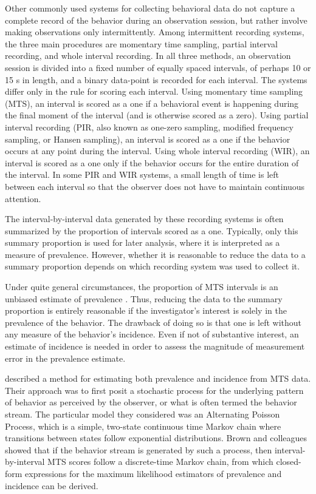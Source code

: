 \documentclass[man, noextraspace, floatsintext]{apa6}\usepackage[]{graphicx}\usepackage[]{color}
\begin{document}
Other commonly used systems for collecting behavioral data do not capture a complete record of the behavior during an observation session, but rather involve making observations only intermittently. 
Among intermittent recording systems, the three main procedures are momentary time sampling, partial interval recording, and whole interval recording. 
In all three methods, an observation session is divided into a fixed number of equally spaced intervals, of perhaps 10 or 15 s in length, and a binary data-point is recorded for each interval. 
The systems differ only in the rule for scoring each interval. 
Using momentary time sampling (MTS), an interval is scored as a one if a behavioral event is happening during the final moment of the interval (and is otherwise scored as a zero). 
Using partial interval recording (PIR, also known as one-zero sampling, modified frequency sampling, or Hansen sampling), an interval is scored as a one if the behavior occurs at any point during the interval. 
Using whole interval recording (WIR), an interval is scored as a one only if the behavior occurs for the entire duration of the interval. 
In some PIR and WIR systems, a small length of time is left between each interval so that the observer does not have to maintain continuous attention. 

The interval-by-interval data generated by these recording systems is often summarized by the proportion of intervals scored as a one. 
Typically, only this summary proportion is used for later analysis, where it is interpreted as a measure of prevalence. 
However, whether it is reasonable to reduce the data to a summary proportion depends on which recording system was used to collect it. 

Under quite general circumstances, the proportion of MTS intervals is an unbiased estimate of prevalence \citep{Rogosa1991statistical}. 
Thus, reducing the data to the summary proportion is entirely reasonable if the investigator's interest is solely in the prevalence of the behavior. 
The drawback of doing so is that one is left without any measure of the behavior's incidence. 
Even if not of substantive interest, an estimate of incidence is needed in order to assess the magnitude of measurement error in the prevalence estimate. 

\citet[see also \citealp{Griffin1983parametric}]{Brown1977estimation} described a method for estimating both prevalence and incidence from MTS data. 
Their approach was to first posit a stochastic process for the underlying pattern of behavior as perceived by the observer, or what is often termed the behavior stream. 
The particular model they considered was an Alternating Poisson Process, which is a simple, two-state continuous time Markov chain where transitions between states follow exponential distributions. 
Brown and colleagues showed that if the behavior stream is generated by such a process, then interval-by-interval MTS scores follow a discrete-time Markov chain, from which closed-form expressions for the maximum likelihood estimators of prevalence and incidence can be derived.
\end{document}
